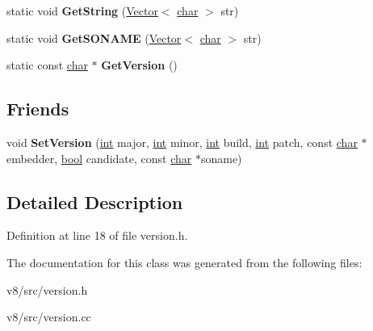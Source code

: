 \begin{DoxyCompactItemize}
\mbox{\label{classv8_1_1internal_1_1Version_aebe98dec5081ad84f4c539d5b5f661e0}} 
static void {\bfseries Get\+String} (\mbox{\hyperlink{classv8_1_1internal_1_1Vector}{Vector}}$<$ \mbox{\hyperlink{classchar}{char}} $>$ str)
\item 
\mbox{\label{classv8_1_1internal_1_1Version_acd1702b2f55cc5b7955c03c4b56d813a}} 
static void {\bfseries Get\+S\+O\+N\+A\+ME} (\mbox{\hyperlink{classv8_1_1internal_1_1Vector}{Vector}}$<$ \mbox{\hyperlink{classchar}{char}} $>$ str)
\item 
\mbox{\label{classv8_1_1internal_1_1Version_a0e4c59ed561ad523f362ba1a5a9b2ca0}} 
static const \mbox{\hyperlink{classchar}{char}} $\ast$ {\bfseries Get\+Version} ()
\end{DoxyCompactItemize}
\subsection*{Friends}
\begin{DoxyCompactItemize}
\item 
\mbox{\label{classv8_1_1internal_1_1Version_a99d96efe5e0d70706796eab1b589ab36}} 
void {\bfseries Set\+Version} (\mbox{\hyperlink{classint}{int}} major, \mbox{\hyperlink{classint}{int}} minor, \mbox{\hyperlink{classint}{int}} build, \mbox{\hyperlink{classint}{int}} patch, const \mbox{\hyperlink{classchar}{char}} $\ast$embedder, \mbox{\hyperlink{classbool}{bool}} candidate, const \mbox{\hyperlink{classchar}{char}} $\ast$soname)
\end{DoxyCompactItemize}


\subsection{Detailed Description}


Definition at line 18 of file version.\+h.



The documentation for this class was generated from the following files\+:\begin{DoxyCompactItemize}
\item 
v8/src/version.\+h\item 
v8/src/version.\+cc\end{DoxyCompactItemize}
